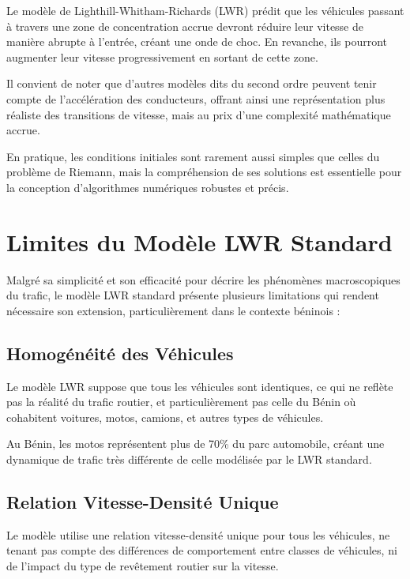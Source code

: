 Le modèle de Lighthill-Whitham-Richards (LWR) prédit que les véhicules passant à travers une zone de concentration accrue devront réduire leur vitesse de manière abrupte à l'entrée, créant une onde de choc. En revanche, ils pourront augmenter leur vitesse progressivement en sortant de cette zone.

Il convient de noter que d'autres modèles dits du second ordre peuvent tenir compte de l'accélération des conducteurs, offrant ainsi une représentation plus réaliste des transitions de vitesse, mais au prix d'une complexité mathématique accrue.

En pratique, les conditions initiales sont rarement aussi simples que celles du problème de Riemann, mais la compréhension de ses solutions est essentielle pour la conception d'algorithmes numériques robustes et précis.

\section{Limites du Modèle LWR Standard}
\label{sec:limites_lwr}

Malgré sa simplicité et son efficacité pour décrire les phénomènes macroscopiques du trafic, le modèle LWR standard présente plusieurs limitations qui rendent nécessaire son extension, particulièrement dans le contexte béninois :

\subsection{Homogénéité des Véhicules}
\label{subsec:homogeneite}

Le modèle LWR suppose que tous les véhicules sont identiques, ce qui ne reflète pas la réalité du trafic routier, et particulièrement pas celle du Bénin où cohabitent voitures, motos, camions, et autres types de véhicules.

\begin{remark}
Au Bénin, les motos représentent plus de 70\% du parc automobile, créant une dynamique de trafic très différente de celle modélisée par le LWR standard.
\end{remark}

\subsection{Relation Vitesse-Densité Unique}
\label{subsec:relation_unique}

Le modèle utilise une relation vitesse-densité unique pour tous les véhicules, ne tenant pas compte des différences de comportement entre classes de véhicules, ni de l'impact du type de revêtement routier sur la vitesse.

